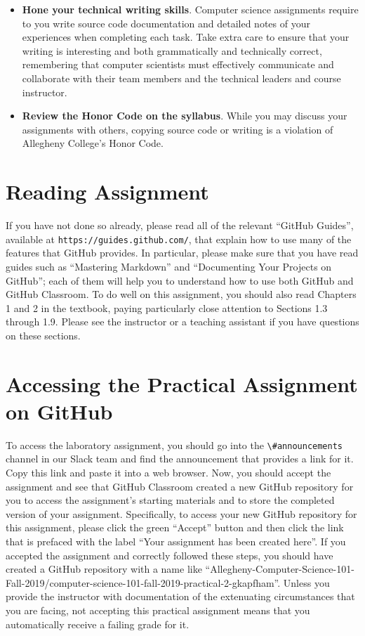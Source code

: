 \documentclass[11pt]{article}
\newcommand{\url}[1]{\lstinline{#1}}
\newcommand{\channel}[1]{\lstinline{#1}}
\begin{document}
\begin{itemize}
\item {\bf Hone your technical writing skills}. Computer science assignments
  require to you write source code documentation and detailed notes of your
  experiences when completing each task. Take extra care to ensure that your
  writing is interesting and both grammatically and technically correct,
  remembering that computer scientists must effectively communicate and
  collaborate with their team members and the technical leaders and course
  instructor.

\item {\bf Review the Honor Code on the syllabus}. While you may discuss your
  assignments with others, copying source code or writing is a violation of
  Allegheny College's Honor Code.

\end{itemize}

\section*{Reading Assignment}

If you have not done so already, please read all of the relevant ``GitHub
Guides'', available at \url{https://guides.github.com/}, that explain how to use
many of the features that GitHub provides. In particular, please make sure that
you have read guides such as ``Mastering Markdown'' and ``Documenting Your
Projects on GitHub''; each of them will help you to understand how to use both
GitHub and GitHub Classroom. To do well on this assignment, you should also read
Chapters 1 and 2 in the textbook, paying particularly close attention to
Sections 1.3 through 1.9. Please see the instructor or a teaching assistant if
you have questions on these sections.

\section*{Accessing the Practical Assignment on GitHub}

To access the laboratory assignment, you should go into the
\channel{\#announcements} channel in our Slack team and find the announcement
that provides a link for it. Copy this link and paste it into a web browser.
Now, you should accept the assignment and see that GitHub Classroom created a
new GitHub repository for you to access the assignment's starting materials and
to store the completed version of your assignment. Specifically, to access your
new GitHub repository for this assignment, please click the green ``Accept''
button and then click the link that is prefaced with the label ``Your
assignment has been created here''. If you accepted the assignment and
correctly followed these steps, you should have created a GitHub repository
with a name like
``Allegheny-Computer-Science-101-Fall-2019/computer-science-101-fall-2019-practical-2-gkapfham''.
Unless you provide the instructor with documentation of the extenuating
circumstances that you are facing, not accepting this practical assignment
means that you automatically receive a failing grade for it.
\end{document}
